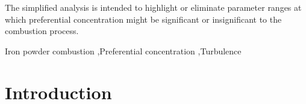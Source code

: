 \documentclass[authoryear,preprint,review,12pt]{elsarticle}
\newcommand{\mrm}[1]{\mathrm{#1}}
\newcommand{\taub}{\tau_\mathrm{b}}
\newcommand{\taue}{\tau_\mathrm{e}}
\begin{document}
\begin{frontmatter}
\begin{highlights}
\begin{itemize}
 \end{itemize}
 \item The simplified analysis is intended to highlight or eliminate parameter ranges at which preferential concentration might be significant or insignificant to the combustion process.
 \end{highlights}
\begin{keyword}
Iron powder combustion \sep Preferential concentration \sep Turbulence


\end{keyword}

\end{frontmatter}



\section{Introduction}\label{sec:introduction}
\end{document}
